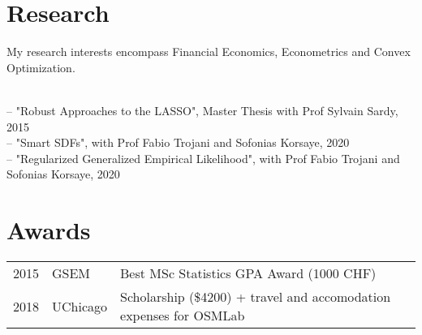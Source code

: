 \documentclass[]{deedy-resume-openfont}
\begin{document}
\begin{minipage}[t]{0.66\textwidth}

\section{Research}
My research interests encompass Financial Economics, Econometrics and
Convex Optimization.
\sectionsep

\\ \small
-- "Robust Approaches to the LASSO", Master Thesis with Prof Sylvain Sardy, 2015 \\
-- "Smart SDFs", with Prof Fabio Trojani and Sofonias Korsaye, 2020 \\
-- "Regularized Generalized Empirical Likelihood", with Prof Fabio Trojani and Sofonias Korsaye, 2020 \\


\section{Awards}
\begin{tabular}{rll}
2015	     & GSEM & Best MSc Statistics GPA Award (1000 CHF)\\
2018         & UChicago & Scholarship (\$4200) + travel and accomodation expenses for OSMLab
\end{tabular}
\sectionsep


% 

\end{minipage} 
\end{document}
